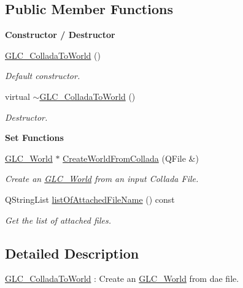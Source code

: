 \subsection*{Public Member Functions}
\begin{Indent}{\bf Constructor / Destructor}\par
\begin{DoxyCompactItemize}
\item 
\hyperlink{class_g_l_c___collada_to_world_a5ac67da8f01a419494eaf8e80cc12c94}{G\-L\-C\-\_\-\-Collada\-To\-World} ()
\begin{DoxyCompactList}\small\item\em Default constructor. \end{DoxyCompactList}\item 
virtual \hyperlink{class_g_l_c___collada_to_world_a49ba34a69f559b5cf52a1d528c15dc06}{$\sim$\-G\-L\-C\-\_\-\-Collada\-To\-World} ()
\begin{DoxyCompactList}\small\item\em Destructor. \end{DoxyCompactList}\end{DoxyCompactItemize}
\end{Indent}
\begin{Indent}{\bf Set Functions}\par
\begin{DoxyCompactItemize}
\item 
\hyperlink{class_g_l_c___world}{G\-L\-C\-\_\-\-World} $\ast$ \hyperlink{class_g_l_c___collada_to_world_acc66f246d61896fc343a3bc65b8a2342}{Create\-World\-From\-Collada} (Q\-File \&)
\begin{DoxyCompactList}\small\item\em Create an \hyperlink{class_g_l_c___world}{G\-L\-C\-\_\-\-World} from an input Collada File. \end{DoxyCompactList}\item 
Q\-String\-List \hyperlink{class_g_l_c___collada_to_world_ab1905f30d4ae0d88f3962057cbe75391}{list\-Of\-Attached\-File\-Name} () const 
\begin{DoxyCompactList}\small\item\em Get the list of attached files. \end{DoxyCompactList}\end{DoxyCompactItemize}
\end{Indent}


\subsection{Detailed Description}
\hyperlink{class_g_l_c___collada_to_world}{G\-L\-C\-\_\-\-Collada\-To\-World} \-: Create an \hyperlink{class_g_l_c___world}{G\-L\-C\-\_\-\-World} from dae file. 

